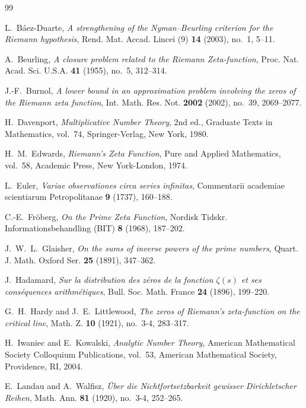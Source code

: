 \begin{thebibliography}{99}

L.~B\'aez-Duarte, \emph{A strengthening of the Nyman--Beurling criterion for the Riemann hypothesis}, Rend. Mat. Accad. Lincei (9) \textbf{14} (2003), no.~1, 5--11.

A.~Beurling, \emph{A closure problem related to the Riemann Zeta-function}, Proc. Nat. Acad. Sci. U.S.A. \textbf{41} (1955), no.~5, 312--314.

J.-F.~Burnol, \emph{A lower bound in an approximation problem involving the zeros of the Riemann zeta function}, Int. Math. Res. Not. \textbf{2002} (2002), no.~39, 2069--2077.

H.~Davenport, \emph{Multiplicative Number Theory}, 2nd ed., Graduate Texts in Mathematics, vol.~74, Springer-Verlag, New York, 1980.

H.~M.~Edwards, \emph{Riemann's Zeta Function}, Pure and Applied Mathematics, vol.~58, Academic Press, New York-London, 1974.

L.~Euler, \emph{Variae observationes circa series infinitas}, Commentarii academiae scientiarum Petropolitanae \textbf{9} (1737), 160--188.

C.-E.~Fr\"oberg, \emph{On the Prime Zeta Function}, Nordisk Tidskr. Informationsbehandling (BIT) \textbf{8} (1968), 187--202.

J.~W.~L.~Glaisher, \emph{On the sums of inverse powers of the prime numbers}, Quart. J. Math. Oxford Ser. \textbf{25} (1891), 347--362.

J.~Hadamard, \emph{Sur la distribution des z\'eros de la fonction $\zeta(s)$ et ses cons\'equences arithm\'etiques}, Bull. Soc. Math. France \textbf{24} (1896), 199--220.

G.~H.~Hardy and J.~E.~Littlewood, \emph{The zeros of Riemann's zeta-function on the critical line}, Math. Z. \textbf{10} (1921), no.~3-4, 283--317.

H.~Iwaniec and E.~Kowalski, \emph{Analytic Number Theory}, American Mathematical Society Colloquium Publications, vol.~53, American Mathematical Society, Providence, RI, 2004.

E.~Landau and A.~Walfisz, \emph{\"Uber die Nichtfortsetzbarkeit gewisser Dirichletscher Reihen}, Math. Ann. \textbf{81} (1920), no.~3-4, 252--265.


\end{thebibliography}
